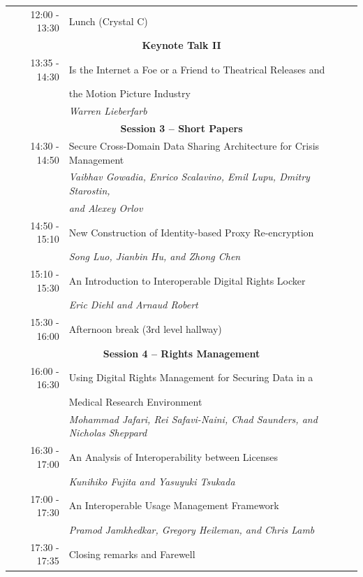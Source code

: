 \documentclass{article}
\begin{document}
\begin{tabularx}{\linewidth}
\begin{tabular}{rl}
\textcolor[rgb]{.3,.3,.3}{12:00 - 13:30} &	\textcolor[rgb]{.3,.3,.3}{Lunch (Crystal C)}\\[1mm]
 
\multicolumn{2}{c}{\bfseries\large \textcolor[rgb]{0,.02,.4}{Keynote Talk II}}\\
13:35 - 14:30 	&
	\textcolor[rgb]{0,.18,.5}{Is the Internet a Foe or a Friend to
          Theatrical Releases and}\\& \textcolor[rgb]{0,.18,.5}{the Motion Picture Industry}\\ 
& \textcolor[rgb]{0,.2,.5}{\itshape Warren Lieberfarb}\\[1mm]

 \multicolumn{2}{c}{\bfseries\large Session 3 -- Short Papers}\\
14:30 - 14:50 &	Secure Cross-Domain Data Sharing Architecture for Crisis Management\\
&\textit{Vaibhav Gowadia, Enrico Scalavino, Emil Lupu, Dmitry
  Starostin,} \\&\textit{and Alexey Orlov}\\ 
14:50 - 15:10 &	New Construction of Identity-based Proxy Re-encryption\\
&\textit{Song Luo, Jianbin Hu, and Zhong Chen}\\
15:10 - 15:30 &	An Introduction to Interoperable Digital Rights Locker\\
&\textit{Eric Diehl and Arnaud Robert}\\[1mm]
 
\textcolor[rgb]{.3,.3,.3}{15:30 - 16:00} &	\textcolor[rgb]{.3,.3,.3}{Afternoon break (3rd level hallway)}\\[1mm]

 \multicolumn{2}{c}{\bfseries\large Session 4 -- Rights Management}\\
16:00 - 16:30 &	Using Digital Rights Management for Securing Data in a\\& Medical Research Environment\\
&\textit{Mohammad Jafari, Rei Safavi-Naini, Chad Saunders, and Nicholas Sheppard}\\
16:30 - 17:00 &	An Analysis of Interoperability between Licenses\\
&\textit{Kunihiko Fujita and Yasuyuki Tsukada}\\
17:00 - 17:30 &	An Interoperable Usage Management Framework\\
&\textit{Pramod Jamkhedkar, Gregory Heileman, and Chris Lamb}\\[1mm] 
17:30 - 17:35 	&Closing remarks and Farewell
\end{tabular}
\end{tabularx}
\end{document}
